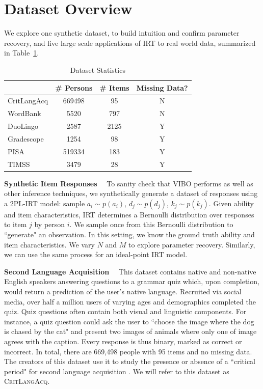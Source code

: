 \section{Dataset Overview}
\label{sec:datasets}
We explore one synthetic dataset, to build intuition and confirm parameter recovery, and five large scale applications of IRT to real world data, summarized in Table~\ref{table:datasets}.

\begin{table}[h!]
    \caption{Dataset Statistics}
    \label{table:datasets}
    \begin{center}
    \begin{tabular}{lccc}
    \hline
    & \# Persons & \# Items & Missing Data? \\
    \hline
    CritLangAcq & 669498 & 95 & N \\
    WordBank & 5520 & 797 & N \\
    DuoLingo & 2587 & 2125 & Y \\
    Gradescope & 1254 & 98 & Y \\
    PISA & 519334 & 183 & Y \\
    TIMSS & 3479 & 28 & Y \\
    \hline
    \end{tabular}
    \end{center}
\end{table}

\noindent\textbf{Synthetic Item Responses}$\quad$
To sanity check that VIBO performs as well as other inference techniques, we synthetically generate a dataset of responses using a 2PL-IRT model:
sample ${a}_i \sim p({a}_i)$, ${d}_j \sim p({d}_j)$, $k_j \sim p(k_j)$.
Given ability and item characteristics, IRT determines a Bernoulli distribution over responses to item $j$ by person $i$. We sample once from this Bernoulli distribution to ``generate" an observation.
In this setting, we know the ground truth ability and item characteristics.
We vary $N$ and $M$ to explore parameter recovery. Similarly, we can use the same process for an ideal-point IRT model.\newline

\noindent\textbf{Second Language Acquisition}$\quad$
This dataset contains native and non-native English speakers answering questions to a grammar quiz which, upon completion, would return a prediction of the user's native language.
Recruited via social media, over half a million users of varying ages and demographics completed the quiz.
Quiz questions often contain both visual and linguistic components.
For instance, a quiz question could ask the user to ``choose the image where the dog is chased by the cat" and present two images of animals where only one of image agrees with the caption.
Every response is thus binary, marked as correct or incorrect.
In total, there are 669,498 people with 95 items and no missing data.
The creators of this dataset use it to study the presence or absence of a ``critical period" for second language acquisition \cite{hartshorne2018critical}.
We will refer to this dataset as \textsc{CritLangAcq}.\newline

